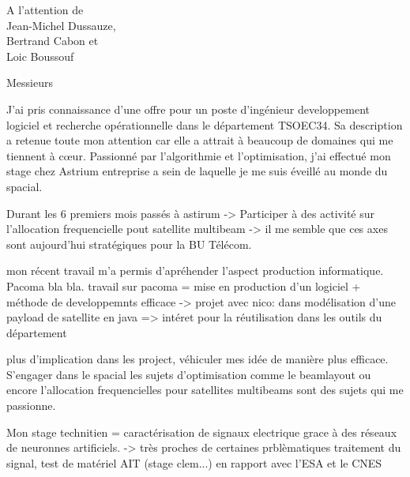 \documentclass[12pt]{lettre}
\begin{document}
\begin{letter}{A l'attention de\\Jean-Michel Dussauze,\\Bertrand Cabon et\\ Loic Boussouf}
\address{Victor Cameo Ponz\\47 rue Guynemer\\31200 Toulouse}
\nofax

\opening{Messieurs}
J'ai pris connaissance d'une offre pour un poste d'ingénieur developpement logiciel et recherche opérationnelle dans le département TSOEC34.
Sa description a retenue toute mon attention car elle a attrait à beaucoup de domaines qui me tiennent à c\oe{}ur.
Passionné par l’algorithmie et l’optimisation, j'ai effectué mon stage chez Astrium entreprise a sein de laquelle je me suis éveillé au monde du spacial.

Durant les 6 premiers mois passés à astirum -> Participer à des activité sur l'allocation frequencielle pout satellite multibeam -> il me semble que ces axes sont aujourd’hui stratégiques pour la BU Télécom.

mon récent travail m'a permis d'apréhender l'aspect production informatique. Pacoma bla bla.
travail sur pacoma =  mise en production d'un logiciel + méthode de developpemnts efficace ->
projet avec nico: dans modélisation d'une payload de satellite en java => intéret pour la réutilisation dans les outils du département

plus d'implication dans les project, véhiculer mes idée de manière plus efficace. S'engager dans le spacial
les sujets d'optimisation comme le beamlayout ou encore l'allocation frequencielles pour satellites multibeams sont des sujets qui me passionne.

Mon stage technitien = caractérisation de signaux electrique grace à des réseaux de neuronnes artificiels. -> très proches de certaines prblèmatiques traitement du signal, test de matériel AIT (stage clem...) en rapport avec l'ESA et le CNES



\end{letter}
\end{document}
